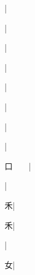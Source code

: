 \begin{multicols}{2}
{{\cjk{}{\cnsym{}　}{\cnsym{}　}{\cnsym{}　}}|{}\par
{\cjk{}{\cnsym{}　}{\cnsym{}　}{\cnsym{}　}}|{}\par
{\cjk{}{\cnsym{}　}{\cnsym{}　}{\cnsym{}　}}|{}\par
{\cjk{}{\cnsym{}　}{\cnsym{}　}{\cnsym{}　}}|{}\par
{}|{}\par
{\cjk{}{\cnsym{}　}{\cnsym{}　}{\cnsym{}　}}|{}\par
{\cjk{}{\cnsym{}　}{\cnsym{}　}{\cnsym{}　}}|{}\par
{\cjk{}{\cnsym{}　}{\cnsym{}　}{\cnsym{}　}}|{}\par
{\cjk{}口{\cnsym{}　}{\cnsym{}　}}|{}\par
{\cjk{}{\cnsym{}　}{\cnsym{}　}{\cnsym{}　}}|{}\par
{\cjk{}{\cnsym{}　}{\cnsym{}　}禾}|{}\par
{\cjk{}{\cnsym{}　}{\cnsym{}　}禾}|{}\par
{}|{}\par
{\cjk{}{\cnsym{}　}{\cnsym{}　}女}|{}\par
}
\end{multicols}
